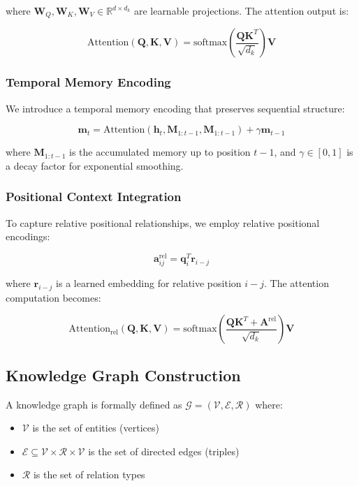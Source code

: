 \documentclass[conference]{IEEEtran}
\begin{document}
where $\mathbf{W}_Q, \mathbf{W}_K, \mathbf{W}_V \in \mathbb{R}^{d \times d_k}$ are learnable projections. The attention output is:

\begin{equation}
\text{Attention}(\mathbf{Q}, \mathbf{K}, \mathbf{V}) = \text{softmax}\left(\frac{\mathbf{Q}\mathbf{K}^T}{\sqrt{d_k}}\right) \mathbf{V}
\end{equation}

\subsubsection{Temporal Memory Encoding}

We introduce a temporal memory encoding that preserves sequential structure:

\begin{equation}
\mathbf{m}_t = \text{Attention}(\mathbf{h}_t, \mathbf{M}_{1:t-1}, \mathbf{M}_{1:t-1}) + \gamma \mathbf{m}_{t-1}
\end{equation}

where $\mathbf{M}_{1:t-1}$ is the accumulated memory up to position $t-1$, and $\gamma \in [0, 1]$ is a decay factor for exponential smoothing.

\subsubsection{Positional Context Integration}

To capture relative positional relationships, we employ relative positional encodings:

\begin{equation}
\mathbf{a}_{ij}^{\text{rel}} = \mathbf{q}_i^T \mathbf{r}_{i-j}
\end{equation}

where $\mathbf{r}_{i-j}$ is a learned embedding for relative position $i-j$. The attention computation becomes:

\begin{equation}
\text{Attention}_{\text{rel}}(\mathbf{Q}, \mathbf{K}, \mathbf{V}) = \text{softmax}\left(\frac{\mathbf{Q}\mathbf{K}^T + \mathbf{A}^{\text{rel}}}{\sqrt{d_k}}\right) \mathbf{V}
\end{equation}

\subsection{Knowledge Graph Construction}

A knowledge graph is formally defined as $\mathcal{G} = (\mathcal{V}, \mathcal{E}, \mathcal{R})$ where:
\begin{itemize}
    \item $\mathcal{V}$ is the set of entities (vertices)
    \item $\mathcal{E} \subseteq \mathcal{V} \times \mathcal{R} \times \mathcal{V}$ is the set of directed edges (triples)
    \item $\mathcal{R}$ is the set of relation types
\end{itemize}
\end{document}
